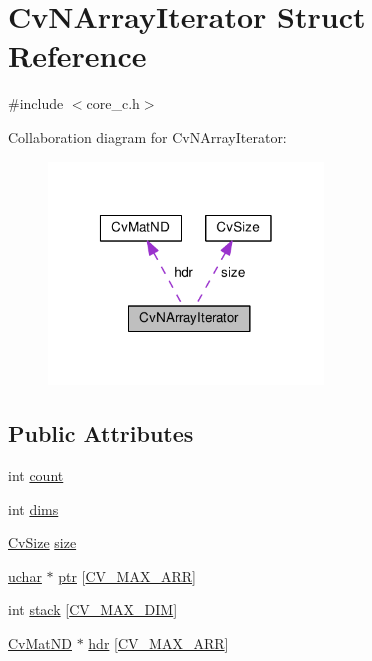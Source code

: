 \hypertarget{structCvNArrayIterator}{\section{Cv\-N\-Array\-Iterator Struct Reference}
\label{structCvNArrayIterator}
}


{\ttfamily \#include $<$core\-\_\-c.\-h$>$}



Collaboration diagram for Cv\-N\-Array\-Iterator\-:\nopagebreak
\begin{figure}[H]
\begin{center}
\leavevmode
\includegraphics[width=207pt]{structCvNArrayIterator__coll__graph}
\end{center}
\end{figure}
\subsection*{Public Attributes}
\begin{DoxyCompactItemize}
\item 
int \hyperlink{structCvNArrayIterator_aa6d032dc0befd446f1281bf99f9554d1}{count}
\item 
int \hyperlink{structCvNArrayIterator_ad57960a049d73d9c51ed4aea6af1fa02}{dims}
\item 
\hyperlink{structCvSize}{Cv\-Size} \hyperlink{structCvNArrayIterator_a9cc7aac6cb3f3d6d3645722c8509f223}{size}
\item 
\hyperlink{core_2types__c_8h_a65f85814a8290f9797005d3b28e7e5fc}{uchar} $\ast$ \hyperlink{structCvNArrayIterator_aeab4b868c639d6c41630fbf37b75c95e}{ptr} \mbox{[}\hyperlink{core__c_8h_ab4d8b1dd2a78a1ae29b12fc74a4d44c8}{C\-V\-\_\-\-M\-A\-X\-\_\-\-A\-R\-R}\mbox{]}
\item 
int \hyperlink{structCvNArrayIterator_a58989ed0ecfcd9f6cef660591535e99e}{stack} \mbox{[}\hyperlink{core_2types__c_8h_a931cb1f0da753cc1f8a3f838390616c2}{C\-V\-\_\-\-M\-A\-X\-\_\-\-D\-I\-M}\mbox{]}
\item 
\hyperlink{structCvMatND}{Cv\-Mat\-N\-D} $\ast$ \hyperlink{structCvNArrayIterator_adb073235c36991f2eeb912225c89faaf}{hdr} \mbox{[}\hyperlink{core__c_8h_ab4d8b1dd2a78a1ae29b12fc74a4d44c8}{C\-V\-\_\-\-M\-A\-X\-\_\-\-A\-R\-R}\mbox{]}
\end{DoxyCompactItemize}


